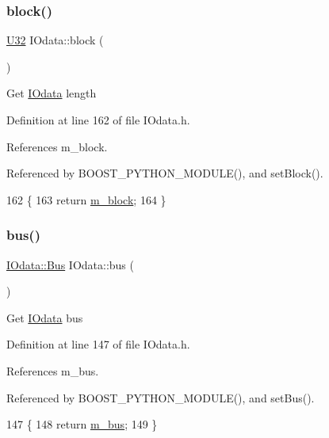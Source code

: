 \subsubsection{\texorpdfstring{block()}{block()}}
{\footnotesize\ttfamily \hyperlink{classIOdata_a96fb57f5fcd87b708743abd3c86a5198}{U32} I\+Odata\+::block (\begin{DoxyParamCaption}{ }\end{DoxyParamCaption})\hspace{0.3cm}{\ttfamily [inline]}}

Get \hyperlink{classIOdata}{I\+Odata} length 

Definition at line 162 of file I\+Odata.\+h.



References m\+\_\+block.



Referenced by B\+O\+O\+S\+T\+\_\+\+P\+Y\+T\+H\+O\+N\+\_\+\+M\+O\+D\+U\+L\+E(), and set\+Block().


\begin{DoxyCode}
162              \{
163     \textcolor{keywordflow}{return} \hyperlink{classIOdata_a6d1ce9f88db6b97ce61098a3693e253f}{m\_block};
164   \}
\end{DoxyCode}
\mbox{\label{classIOdata_ab904bcca0e8e3bebc3299e47ca93a8a1}} 
\subsubsection{\texorpdfstring{bus()}{bus()}}
{\footnotesize\ttfamily \hyperlink{classIOdata_a99aa7bed39364c4359ab8a7596bc013c}{I\+Odata\+::\+Bus} I\+Odata\+::bus (\begin{DoxyParamCaption}{ }\end{DoxyParamCaption})\hspace{0.3cm}{\ttfamily [inline]}}

Get \hyperlink{classIOdata}{I\+Odata} bus 

Definition at line 147 of file I\+Odata.\+h.



References m\+\_\+bus.



Referenced by B\+O\+O\+S\+T\+\_\+\+P\+Y\+T\+H\+O\+N\+\_\+\+M\+O\+D\+U\+L\+E(), and set\+Bus().


\begin{DoxyCode}
147                  \{
148     \textcolor{keywordflow}{return} \hyperlink{classIOdata_a42c07a9b3f43ec35dd18d13a67d294cc}{m\_bus};
149   \}
\end{DoxyCode}
\mbox{\label{classIOdata_a13016f489aba6e80cd7be53224c3e8ab}} 
